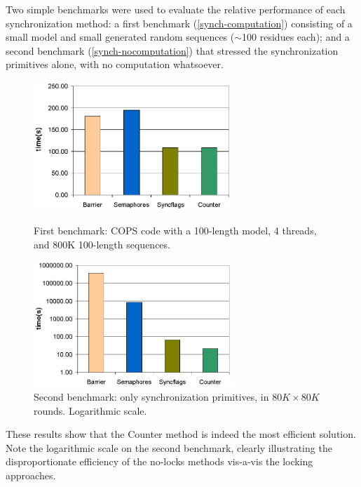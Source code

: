 Two simple benchmarks were used to evaluate the relative performance of each synchronization method: a first benchmark (\autoref{synch-computation}) consisting of a small model and small generated random sequences ($\sim$100 residues each); and a second benchmark (\autoref{synch-nocomputation}) that stressed the synchronization primitives alone, with no computation whatsoever.

\begin{figure}[htb!]
    \begin{minipage}{0.48\linewidth}
		\centering
		\includegraphics[width=7.5cm]{graphics/synch-computation.png} 
		\caption[Synchronization Evaluation with computation] {First benchmark: COPS code with a 100-length model, 4 threads, and 800K 100-length sequences.}
		\label{synch-computation}
    \end{minipage}
    \hspace{0.04\linewidth}
    \begin{minipage}{0.48\linewidth}
		\centering
		\includegraphics[width=7.5cm]{graphics/synch-nocomputation.png} 
		\caption[Synchronization Evaluation without computation] {Second benchmark: only synchronization primitives, in $80K \times 80K$ rounds. Logarithmic scale.}
		\label{synch-nocomputation}
    \end{minipage}
\end{figure}


These results show that the Counter method is indeed the most efficient solution. Note the logarithmic scale on the second benchmark, clearly illustrating the disproportionate efficiency of the no-locks methods vis-a-vis the locking approaches.

